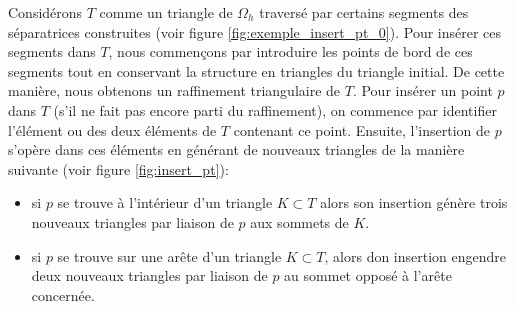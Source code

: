 Considérons $T$ comme un triangle de $\Omega_h$ traversé par certains segments des séparatrices construites (voir figure \ref{fig:exemple_insert_pt_0}). Pour insérer ces segments dans $T$, nous commençons par introduire les points de bord de ces segments tout en conservant la structure en triangles du triangle initial. De cette manière, nous obtenons un raffinement triangulaire de $T$. Pour insérer un point $p$ dans $T$ (s'il ne fait pas encore parti du raffinement), on commence par identifier l'élément ou des deux éléments de $T$ contenant ce point. Ensuite, l'insertion de $p$ s'opère dans ces éléments en générant de nouveaux triangles de la manière suivante (voir figure \ref{fig:insert_pt}):\\
\begin{itemize}
 \item si $p$ se trouve à l'intérieur d'un triangle $K\subset T$ alors son insertion génère trois nouveaux triangles par liaison de $p$ aux sommets de $K$.\\
 \item si $p$ se trouve sur une arête d'un triangle $K\subset T$, alors don insertion engendre deux nouveaux triangles par liaison de $p$ au sommet opposé à l'arête concernée.
\end{itemize}

